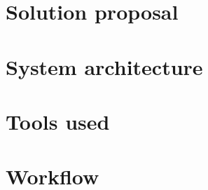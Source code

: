\section{Solution proposal}

\section{System architecture}

\section{Tools used}

\section{Workflow}